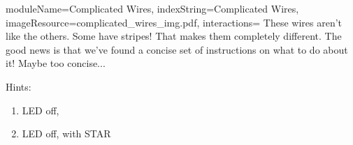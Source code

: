 \documentclass{../../ktane-mod}
\begin{document}
\begin{module}{
  moduleName=Complicated Wires,
  indexString=Complicated Wires,
  imageResource=complicated_wires_img.pdf,
  interactions=\keysymbol
}
{
  \sloppy
  These wires aren't like the others. Some have stripes! That makes them completely different. The good news is that we've found a concise set of instructions on what to do about it! Maybe too concise...
}

\newlength{\cellwidth}
\newlength{\cellheight}
\newlength{\cellheightwithoutpadding}
\setlength{\cellwidth}{1cm}
\setlength{\cellheight}{1.13cm}
\setlength{\cellheightwithoutpadding}{1cm}
\newlength{\lastcellwidth}
\setlength{\lastcellwidth}{2.1cm}
\newlength{\fivecellwidth}
\setlength{\fivecellwidth}{5.69cm}
\newlength{\twocellheight}
\setlength{\twocellheight}{2\cellheight}
\newlength{\circleoffset}
\setlength{\circleoffset}{0.20\cellwidth}
\newlength{\staroffset}
\setlength{\staroffset}{0.05\cellwidth}
\newlength{\tablelinewidth}
\setlength{\tablelinewidth}{1pt}

\begin{bulletlist}
\end{bulletlist}

Hints:
\begin{bulletlist}
\end{bulletlist}

\vspace{2cm}

\begin{minipage}[t]{0.48\textwidth}
\begin{enumerate}
  \renewcommand{\labelenumi}{\alph{enumi}.}
  \item LED off, 
  \item LED off, \RED with STAR
\end{enumerate}

\vspace{0.5cm}


\end{minipage}
\end{module}
\end{document}
